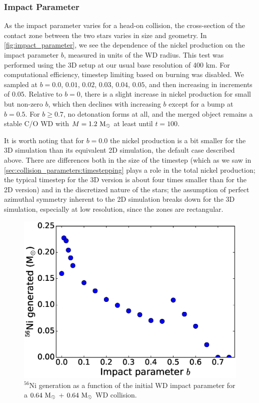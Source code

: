 \documentclass[12pt]{article}
\begin{document}
\subsubsection{Impact Parameter}
\label{sec:collision_parameters:impactparameter}

As the impact parameter varies for a head-on collision, the cross-section of the contact
zone between the two stars varies in size and geometry. In \autoref{fig:impact_parameter}, we
see the dependence of the nickel production on the impact parameter $b$, measured in units
of the WD radius. This test was performed using the 3D setup at our usual base resolution of
400 km. For computational efficiency, timestep limiting based on burning was disabled.
We sampled at $b = 0.0$, $0.01$, $0.02$, $0.03$, $0.04$, $0.05$, and then increasing
in increments of $0.05$. Relative to $b = 0$, there is a slight increase in nickel production for small
but non-zero $b$, which then declines with increasing $b$ except for a bump at $b = 0.5$.
For $b \ge 0.7$, no detonation forms at all, and the merged object remains a stable C/O WD
with $M = 1.2\ \mathrm{M}_\odot$ at least until $t = 100$.

It is worth noting that for $b = 0.0$ the nickel production is a bit smaller for the 3D simulation
than its equivalent 2D simulation, the default case described above. There are differences both in
the size of the timestep (which as we saw in \autoref{sec:collision_parameters:timestepping} plays a role in
the total nickel production; the typical timestep for the 3D version is about four times smaller than
for the 2D version) and in the discretized nature of the stars; the assumption of perfect
azimuthal symmetry inherent to the 2D simulation breaks down for the 3D simulation, especially at
low resolution, since the zones are rectangular.

\begin{figure}
  \centering
  \includegraphics[scale=0.8]{plots/impact_parameter}
  \caption[Nickel production dependence on the impact parameter]
          {$^{56}$Ni generation as a function of the initial WD impact parameter for
           a $0.64\ \mathrm{M}_\odot$ + $0.64\ \mathrm{M}_\odot$ WD collision.
           \label{fig:impact_parameter}}
\end{figure}
\end{document}

